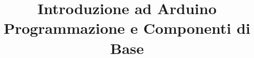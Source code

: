 \documentclass[a4paper, 11pt]{book}
\title{\Huge{Introduzione ad Arduino\\Programmazione e  Componenti di Base}}
\begin{document}
\maketitle
\tableofcontents

\end{document}
